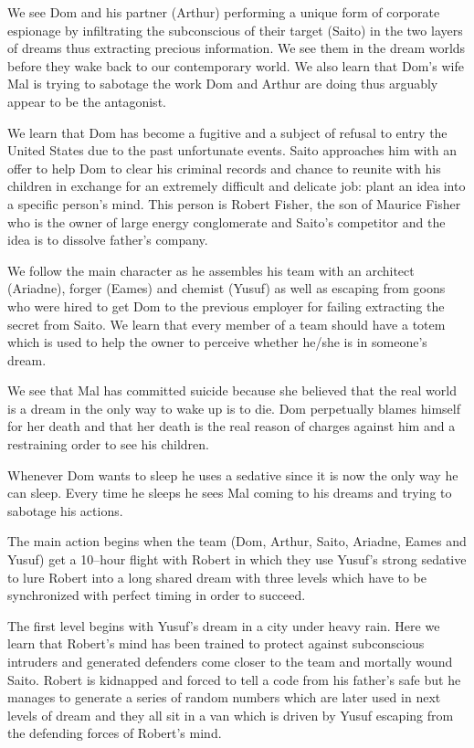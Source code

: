 \documentclass{article}
\begin{document}
We see Dom and his partner (Arthur) performing a unique form of corporate
espionage by infiltrating the subconscious of their target (Saito) in the two
layers of dreams thus extracting precious information. We see them in the dream
worlds before they wake back to our contemporary world. We also learn that Dom's
wife Mal is trying to sabotage the work Dom and Arthur are doing thus arguably
appear to be the antagonist.

We learn that Dom has become a fugitive and a subject of refusal to entry the
United States due to the past unfortunate events. Saito approaches him with an
offer to help Dom to clear his criminal records and chance to reunite with his
children in exchange for an extremely difficult and delicate job: plant an idea
into a specific person's mind. This person is Robert Fisher, the son of Maurice
Fisher who is the owner of large energy conglomerate and Saito's competitor and
the idea is to dissolve father's company.

We follow the main character as he assembles his team with an architect
(Ariadne), forger (Eames) and chemist (Yusuf) as well as escaping from goons who
were hired to get Dom to the previous employer for failing extracting the secret
from Saito. We learn that every member of a team should have a totem which is
used to help the owner to perceive whether he/she is in someone's dream.

We see that Mal has committed suicide because she believed that the real world is
a dream in the only way to wake up is to die. Dom perpetually blames himself for
her death and that her death is the real reason of charges against him and a
restraining order to see his children.

Whenever Dom wants to sleep he uses a sedative since it is now the only way he
can sleep. Every time he sleeps he sees Mal coming to his dreams and trying to
sabotage his actions.

The main action begins when the team (Dom, Arthur, Saito, Ariadne, Eames and
Yusuf) get a 10--hour flight with Robert in which they use Yusuf's strong
sedative to lure Robert into a long shared dream with three levels which have to
be synchronized with perfect timing in order to succeed.

The first level begins with Yusuf's dream in a city under heavy rain. Here we
learn that Robert's mind has been trained to protect against subconscious
intruders and generated defenders come closer to the team and mortally wound
Saito. Robert is kidnapped and forced to tell a code from his father's safe but
he manages to generate a series of random numbers which are later used in next
levels of dream and they all sit in a van which is driven by Yusuf escaping from
the defending forces of Robert's mind.
\end{document}
